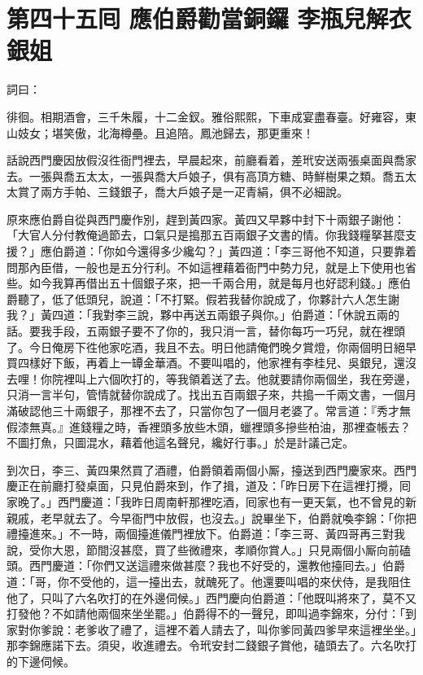 
\chapter*{第四十五囘 應伯爵勸當銅鑼 李瓶兒解衣銀姐}


詞曰：

\begin{myquote}
徘徊。相期酒會，三千朱履，十二金釵。雅俗熙熙，下車成宴盡春臺。好雍容，東山妓女；堪笑傲，北海樽壘。且追陪。鳳池歸去，那更重來！

\end{myquote}

話說西門慶因放假沒徃衙門裡去，早晨起來，前廳看着，差玳安送兩張桌面與喬家去。一張與喬五太太，一張與喬大戶娘子，俱有高頂方糖、時鮮樹果之類。喬五太太賞了兩方手帕、三錢銀子，喬大戶娘子是一疋青絹，俱不必細說。

原來應伯爵自從與西門慶作別，趕到黃四家。黃四又早夥中封下十兩銀子謝他：「大官人分付教俺過節去，口氣只是搗那五百兩銀子文書的情。你我錢糧拏甚麼支援？」應伯爵道：「你如今還得多少纔勾？」黃四道：「李三哥他不知道，只要靠着問那內臣借，一般也是五分行利。不如這裡藉着衙門中勢力兒，就是上下使用也省些。如今我算再借出五十個銀子來，把一千兩合用，就是每月也好認利錢。」應伯爵聽了，低了低頭兒，說道：「不打緊。假若我替你說成了，你夥計六人怎生謝我？」黃四道：「我對李三說，夥中再送五兩銀子與你。」伯爵道：「休說五兩的話。要我手段，五兩銀子要不了你的，我只消一言，替你每巧一巧兒，就在裡頭了。今日俺房下徃他家吃酒，我且不去。明日他請俺們晚夕賞燈，你兩個明日絕早買四樣好下飯，再着上一罈金華酒。不要叫唱的，他家裡有李桂兒、吳銀兒，還沒去哩！你院裡叫上六個吹打的，等我領着送了去。他就要請你兩個坐，我在旁邊，只消一言半句，管情就替你說成了。找出五百兩銀子來，共搗一千兩文書，一個月滿破認他三十兩銀子，那裡不去了，只當你包了一個月老婆了。常言道：『秀才無假漆無真。』{}進錢糧之時，香裡頭多放些木頭，蠟裡頭多摻些柏油，那裡查帳去？不圖打魚，只圖混水，藉着他這名聲兒，纔好行事。」於是計議己定。

到次日，李三、黃四果然買了酒禮，伯爵領着兩個小厮，擡送到西門慶家來。西門慶正在前廳打發桌面，只見伯爵來到，作了揖，道及：「昨日房下在這裡打攪，囘家晚了。」西門慶道：「我昨日周南軒那裡吃酒，囘家也有一更天氣，也不曾見的新親戚，老早就去了。今早衙門中放假，也沒去。」說畢坐下，伯爵就喚李錦：「你把禮擡進來。」不一時，兩個擡進儀門裡放下。伯爵道：「李三哥、黃四哥再三對我說，受你大恩，節間沒甚麼，買了些微禮來，孝順你賞人。」只見兩個小厮向前磕頭。西門慶道：「你們又送這禮來做甚麼？我也不好受的，還教他擡囘去。」伯爵道：「哥，你不受他的，這一擡出去，就醜死了。他還要叫唱的來伏侍，是我阻住他了，只叫了六名吹打的在外邊伺候。」西門慶向伯爵道：「他既叫將來了，莫不又打發他？不如請他兩個來坐坐罷。」伯爵得不的一聲兒，即叫過李錦來，分付：「到家對你爹說：老爹收了禮了，這裡不着人請去了，叫你爹同黃四爹早來這裡坐坐。」那李錦應諾下去。須臾，收進禮去。令玳安封二錢銀子賞他，磕頭去了。六名吹打的下邊伺候。


